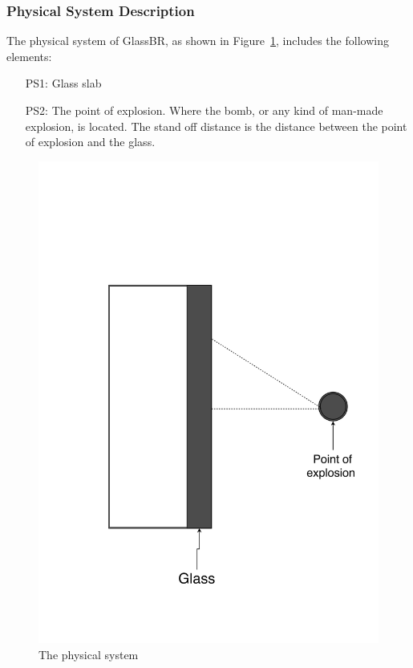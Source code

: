 \documentclass[12pt]{article}
\begin{document}
\subsubsection{Physical System Description}
\label{Sec:PhysSyst}
The physical system of GlassBR, as shown in Figure~\ref{Figure:physSystImage}, includes the following elements:
\begin{itemize}
\item[PS1:]Glass slab
\item[PS2:]The point of explosion. Where the bomb, or any kind of man-made explosion, is located. The stand off distance is the distance between the point of explosion and the glass.
\end{itemize}
\begin{figure}
\begin{center}
\includegraphics[width=\textwidth]{../../../datafiles/GlassBR/physicalsystimage.png}
\caption{The physical system}
\label{Figure:physSystImage}
\end{center}
\end{figure}
\end{document}
